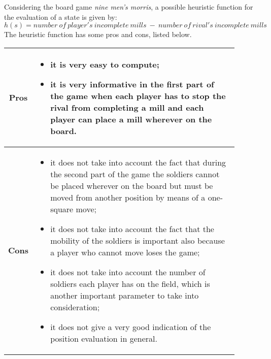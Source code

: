 Considering the board game \textit{nine men's morris}, a possible heuristic function for the evaluation of a state is given by:
\begin{equation*}
    h(s)=number\ of\ player's\ incomplete\ mills\ -\ number\ of\ rival's\ incomplete\ mills
\end{equation*}
The heuristic function has some pros and cons, listed below.

\begin{tabular}{ c m{0.9\linewidth} }
    \textbf{Pros} &
    \begin{itemize}
        \item it is very easy to compute;
        \item it is very informative in the first part of the game when each player has to stop the rival from completing a mill and each player can place a mill wherever on the board.
    \end{itemize} \\
    \midrule
    \textbf{Cons} &
    \begin{itemize}
        \item it does not take into account the fact that during the second part of the game the soldiers cannot be placed wherever on the board but must be moved from another position by means of a one-square move;
        \item it does not take into account the fact that the mobility of the soldiers is important also because a player who cannot move loses the game;
        \item it does not take into account the number of soldiers each player has on the field, which is another important parameter to take into consideration;
        \item it does not give a very good indication of the position evaluation in general.
    \end{itemize} \\
\end{tabular}



